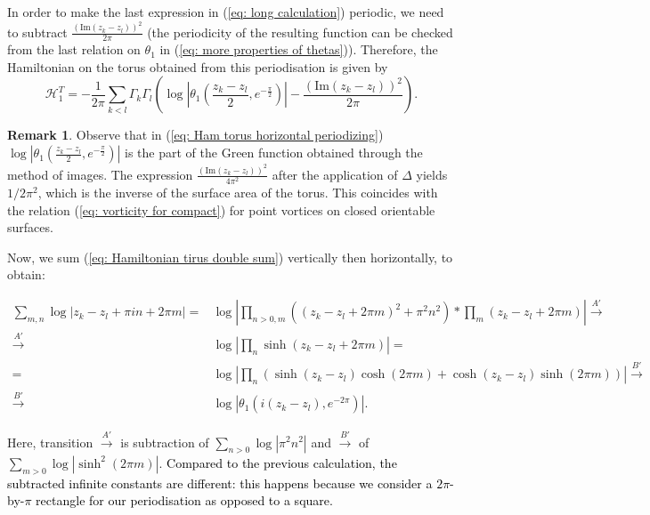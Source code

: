 \documentclass[11pt,twoside]{article}
\theoremstyle{definition}
\newtheorem{rem}[theorem]{Remark}
\numberwithin{equation}{section}
\begin{document}
In order to make the last expression in (\ref{eq: long calculation}) periodic, we need to subtract $\frac{\left(\mathrm{Im}\left(z_k-z_l\right)\right)^2}{2\pi}$ (the periodicity of the resulting function can be checked from the last relation on $\theta_1$ in (\ref{eq: more properties of thetas})). Therefore, the Hamiltonian on the torus obtained from this periodisation is given by 
\begin{equation}
    \label{eq: Ham torus horizontal periodizing}
   \mathcal{H}^T_1 =  -\frac{1}{2\pi}\sum_{k<l}\Gamma_k\Gamma_l\left(\log\left|\theta_1\left(\frac{z_k-z_l}{2},e^{-\frac{\pi}{2}}\right)\right| - \frac{\left(\mathrm{Im}\left(z_k-z_l\right)\right)^2}{2\pi}\right). 
\end{equation}
\begin{rem}
 Observe that in (\ref{eq: Ham torus horizontal periodizing}) $\log\left|\theta_1\left(\frac{z_k-z_l}{2},e^{-\frac{\pi}{2}}\right)\right|$ is the part of the Green function obtained through the method of images. The expression  $\frac{\left(\mathrm{Im}\left(z_k-z_l\right)\right)^2}{4\pi^2}$ after the application of $\Delta$ yields $1/2\pi^2$, which is the inverse of the surface area of the torus. This coincides with the relation (\ref{eq: vorticity for compact}) for point vortices on closed orientable surfaces.  
\end{rem}
Now, we sum (\ref{eq: Hamiltonian tirus double sum}) vertically then horizontally, to obtain:
\begin{small}
\begin{equation*}
    \begin{split}
      \sum_{m,n}\log\left|z_k-z_l +\pi i n + 2\pi m \right|  =& \log\left|\prod_{n>0, m}\left((z_k-z_l +2 \pi m)^2 + \pi^2 n^2\right) \ast\prod_m\left(z_k-z_l +2\pi m\right)\right| \xrightarrow[]{A'} \\
      \xrightarrow[]{A'}&\log\left|\prod_n\sinh\left(z_k-z_l + 2\pi m\right)\right|= \\=&
      \log\left|\prod_n\left(\sinh\left(z_k-z_l\right)\cosh\left(2\pi m\right) +\cosh\left(z_k-z_l\right)\sinh\left(2\pi m\right)\right)\right| \xrightarrow[]{B'}\\\xrightarrow[]{B'}&\log\left|\theta_1\left(i\left(z_k-z_l\right),e^{-2\pi}\right)\right|.
    \end{split}
\end{equation*}
\end{small}

Here, transition $\xrightarrow[]{A'}$ is subtraction of $\sum\limits_{n>0}\log\left|\pi^2n^2\right|$ and $\xrightarrow[]{B'}$  of $\sum\limits_{m>0}\log\left|\sinh^2\left(2\pi m\right)\right|$. \textcolor{black}{Compared to the previous calculation, the subtracted infinite constants are different: this happens because we consider a $2\pi$-by-$\pi$ rectangle for our periodisation as opposed to a square.}
\end{document}
